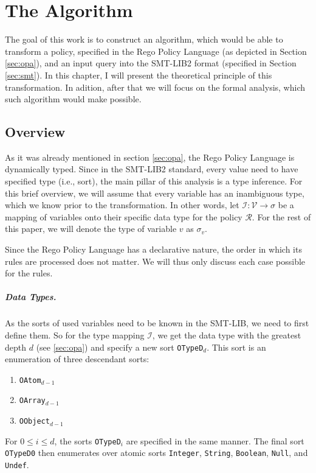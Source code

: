 \chapter{The Algorithm}
\label{ch:algorithm}

The goal of this work is to construct an algorithm, which would be able to transform a policy, specified in the Rego Policy Language (as depicted in Section \ref{sec:opa}), and an input query into the SMT-LIB2 format (specified in Section \ref{sec:smt}).
In this chapter, I will present the theoretical principle of this transformation.
In adition, after that we will focus on the formal analysis, which such algorithm would make possible.

\section{Overview}
\label{sec:overview}

As it was already mentioned in section \ref{sec:opa}, the Rego Policy Language is dynamically typed.
Since in the SMT-LIB2 standard, every value need to have specified type (i.e., sort), the main pillar of this analysis is a type inference.
For this brief overview, we will assume that every variable has an inambiguous type, which we know prior to the transformation.
In other words, let $\mathcal{I}: \mathcal{V} \rightarrow \sigma$ be a mapping of variables onto their specific data type for the policy $\mathcal{R}$.
For the rest of this paper, we will denote the type of variable $v$ as $\sigma_v$.

Since the Rego Policy Language has a declarative nature, the order in which its rules are processed does not matter.
We will thus only discuss each case possible for the rules.

\paragraph{Data Types.}
As the sorts of used variables need to be known in the SMT-LIB, we need to first define them.
So for the type mapping $\mathcal{I}$, we get the data type with the greatest depth $d$ (see \ref{sec:opa}) %
and specify a new sort \texttt{OTypeD$_d$}.
This sort is an enumeration of three descendant sorts:
\begin{enumerate}
    \item \texttt{OAtom$_{d-1}$}
    \item \texttt{OArray$_{d-1}$}
    \item \texttt{OObject$_{d-1}$}
\end{enumerate}
For $0 \le i \le d$, the sorts \texttt{OTypeD$_i$} are specified in the same manner.
The final sort \texttt{OTypeD0} then enumerates over atomic sorts \texttt{Integer}, \texttt{String}, \texttt{Boolean}, \texttt{Null}, and \texttt{Undef}.


